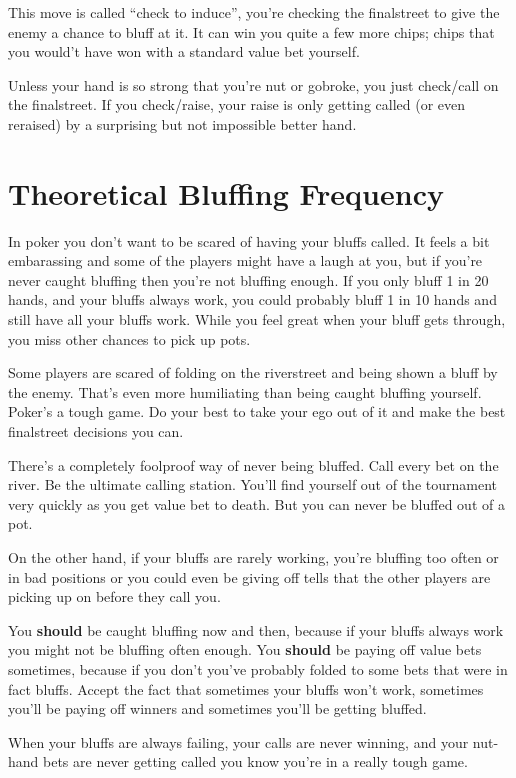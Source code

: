 This move is called ``check to induce'', you're checking the
finalstreet to give the enemy a chance to bluff at it. It can win you
quite a few more chips; chips that you would't have won with a
standard value bet yourself.

Unless your hand is so strong that you're nut or gobroke, you just
check/call on the finalstreet. If you check/raise, your raise is only
getting called (or even reraised) by a surprising but not impossible
better hand.

\section{Theoretical Bluffing Frequency}

In poker you don't want to be scared of having your bluffs called. It
feels a bit embarassing and some of the players might have a laugh at
you, but if you're never caught bluffing then you're not bluffing
enough. If you only bluff 1 in 20 hands, and your bluffs always work,
you could probably bluff 1 in 10 hands and still have all your bluffs
work. While you feel great when your bluff gets through, you miss
other chances to pick up pots.

Some players are scared of folding on the riverstreet and being shown
a bluff by the enemy. That's even more humiliating than being caught
bluffing yourself. Poker's a tough game. Do your best to take your ego
out of it and make the best finalstreet decisions you can.

There's a completely foolproof way of never being bluffed. Call every
bet on the river. Be the ultimate calling station. You'll find
yourself out of the tournament very quickly as you get value bet to
death. But you can never be bluffed out of a pot.

On the other hand, if your bluffs are rarely working, you're bluffing
too often or in bad positions or you could even be giving off tells
that the other players are picking up on before they call you.

You \textbf{should} be caught bluffing now and then, because if your
bluffs always work you might not be bluffing often enough. You
\textbf{should} be paying off value bets sometimes, because if you
don't you've probably folded to some bets that were in fact bluffs.
Accept the fact that sometimes your bluffs won't work, sometimes
you'll be paying off winners and sometimes you'll be getting bluffed.

When your bluffs are always failing, your calls are never winning,
and your nut-hand bets are never getting called
you know you're in a really tough game.
